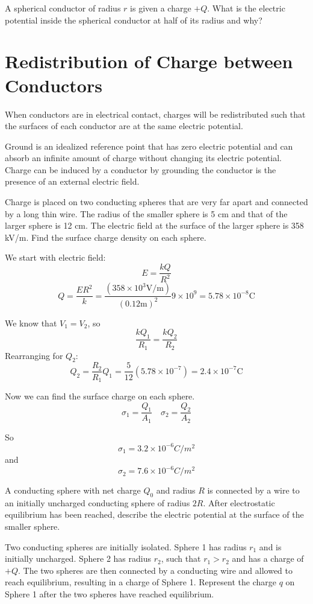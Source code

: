 \documentclass[../em.tex]{subfiles}
\begin{document}
\ex A spherical conductor of radius $r$ is given a charge $+Q$. What is the electric potential inside the spherical conductor at half of its radius and why?

\section{Redistribution of Charge between Conductors}
When conductors are in electrical contact, charges will be redistributed such that the surfaces of each conductor are at the same electric potential.

Ground is an idealized reference point that has zero electric potential and can absorb an 
infinite amount of charge without changing its electric potential. Charge can be induced by a conductor by grounding the conductor is the presence of an external electric field.

\pagebreak
\begin{example}
    Charge is placed on two conducting spheres that are very far apart and connected by a long thin wire. 
    The radius of the smaller sphere is 5 cm and that of the larger sphere is 12 cm. The electric field at the 
    surface of the larger sphere is 358 kV/m. Find the surface charge density on each sphere.

    We start with electric field:
    \[E = \frac{kQ}{R^2}\] 
    \[Q = \frac{ER^2}{k}=\frac{(358\times 10^3 \text{V/m})}{(0.12\text{m})^2}{9\times 10^9}= 5.78\times 10^{-8}\text{C}\]

    We know that $V_1 = V_2$, so 
    \[\frac{kQ_1}{R_1}=\frac{kQ_2}{R_2}\] 
    Rearranging for $Q_2$:
    \[Q_2=\frac{R_2}{R_1}Q_1 = \frac{5}{12}(5.78\times10^{-7})=2.4\times10^{-7}\text{C}\]

    Now we can find the surface charge on each sphere. 
    \[\sigma_1=\frac{Q_1}{A_1} \quad \sigma_2 = \frac{Q_2}{A_2}\]

    So \[\sigma_1 = 3.2\times 10^{-6} C/m^2\]
    and \[\sigma_2 = 7.6\times 10^{-6} C/m^2\] 
\end{example}

\ex A conducting sphere with net charge $Q_0$ and radius $R$ is connected by a wire to an initially uncharged conducting sphere of 
radius $2R$. After electrostatic equilibrium has been reached, describe the electric potential at the surface of the smaller sphere.

\ex Two conducting spheres are initially isolated. Sphere 1 has radius $r_1$ and is initially uncharged. Sphere 2 has radius $r_2$, such that $r_1>r_2$ and has a charge of $+Q$. The two spheres are then connected 
by a conducting wire and allowed to reach equilibrium, resulting in a charge of Sphere 1. 
Represent the charge $q$ on Sphere 1 after the two spheres have reached equilibrium.
\end{document}
